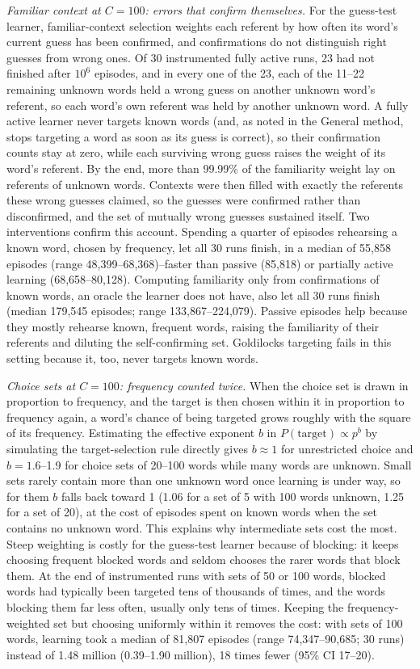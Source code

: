 \documentclass[11pt]{article}
\begin{document}
\textit{Familiar context at $C=100$: errors that confirm themselves.} For the guess-test learner, familiar-context selection weights each referent by how often its word's current guess has been confirmed, and confirmations do not distinguish right guesses from wrong ones. Of 30 instrumented fully active runs, 23 had not finished after $10^6$ episodes, and in every one of the 23, each of the 11--22 remaining unknown words held a wrong guess on another unknown word's referent, so each word's own referent was held by another unknown word. A fully active learner never targets known words (and, as noted in the General method, stops targeting a word as soon as its guess is correct), so their confirmation counts stay at zero, while each surviving wrong guess raises the weight of its word's referent. By the end, more than 99.99\% of the familiarity weight lay on referents of unknown words. Contexts were then filled with exactly the referents these wrong guesses claimed, so the guesses were confirmed rather than disconfirmed, and the set of mutually wrong guesses sustained itself. Two interventions confirm this account. Spending a quarter of episodes rehearsing a known word, chosen by frequency, let all 30 runs finish, in a median of 55,858 episodes (range 48,399--68,368)--faster than passive (85,818) or partially active learning (68,658--80,128). Computing familiarity only from confirmations of known words, an oracle the learner does not have, also let all 30 runs finish (median 179,545 episodes; range 133,867--224,079). Passive episodes help because they mostly rehearse known, frequent words, raising the familiarity of their referents and diluting the self-confirming set. Goldilocks targeting fails in this setting because it, too, never targets known words.

\textit{Choice sets at $C=100$: frequency counted twice.} When the choice set is drawn in proportion to frequency, and the target is then chosen within it in proportion to frequency again, a word's chance of being targeted grows roughly with the square of its frequency. Estimating the effective exponent $b$ in $P(\mathrm{target}) \propto p^b$ by simulating the target-selection rule directly gives $b \approx 1$ for unrestricted choice and $b = 1.6$--1.9 for choice sets of 20--100 words while many words are unknown. Small sets rarely contain more than one unknown word once learning is under way, so for them $b$ falls back toward 1 (1.06 for a set of 5 with 100 words unknown, 1.25 for a set of 20), at the cost of episodes spent on known words when the set contains no unknown word. This explains why intermediate sets cost the most. Steep weighting is costly for the guess-test learner because of blocking: it keeps choosing frequent blocked words and seldom chooses the rarer words that block them. At the end of instrumented runs with sets of 50 or 100 words, blocked words had typically been targeted tens of thousands of times, and the words blocking them far less often, usually only tens of times. Keeping the frequency-weighted set but choosing uniformly within it removes the cost: with sets of 100 words, learning took a median of 81,807 episodes (range 74,347--90,685; 30 runs) instead of 1.48 million (0.39--1.90 million), 18 times fewer (95\% CI 17--20).
\end{document}
